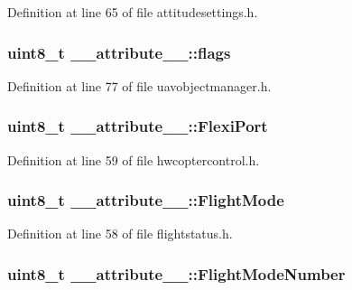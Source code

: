 \-Definition at line 65 of file attitudesettings.\-h.

\hypertarget{struct____attribute_____a2c5106312c60da8340d95ea8f201e8f2}{
\subsubsection[{flags}]{\setlength{\rightskip}{0pt plus 5cm}uint8\-\_\-t {\bf \-\_\-\-\_\-attribute\-\_\-\-\_\-\-::flags}}}\label{struct____attribute_____a2c5106312c60da8340d95ea8f201e8f2}


\-Definition at line 77 of file uavobjectmanager.\-h.

\hypertarget{struct____attribute_____a812eb6cabc8e5c22ec2828cc0c57b4b3}{
\subsubsection[{\-Flexi\-Port}]{\setlength{\rightskip}{0pt plus 5cm}uint8\-\_\-t {\bf \-\_\-\-\_\-attribute\-\_\-\-\_\-\-::\-Flexi\-Port}}}\label{struct____attribute_____a812eb6cabc8e5c22ec2828cc0c57b4b3}


\-Definition at line 59 of file hwcoptercontrol.\-h.

\hypertarget{struct____attribute_____ae6cfb7812d5f74336f772ea545dff592}{
\subsubsection[{\-Flight\-Mode}]{\setlength{\rightskip}{0pt plus 5cm}uint8\-\_\-t {\bf \-\_\-\-\_\-attribute\-\_\-\-\_\-\-::\-Flight\-Mode}}}\label{struct____attribute_____ae6cfb7812d5f74336f772ea545dff592}


\-Definition at line 58 of file flightstatus.\-h.

\hypertarget{struct____attribute_____a7ed2a001e08fda9e3fe9ab76c5d3bd3a}{
\subsubsection[{\-Flight\-Mode\-Number}]{\setlength{\rightskip}{0pt plus 5cm}uint8\-\_\-t {\bf \-\_\-\-\_\-attribute\-\_\-\-\_\-\-::\-Flight\-Mode\-Number}}}\label{struct____attribute_____a7ed2a001e08fda9e3fe9ab76c5d3bd3a}


